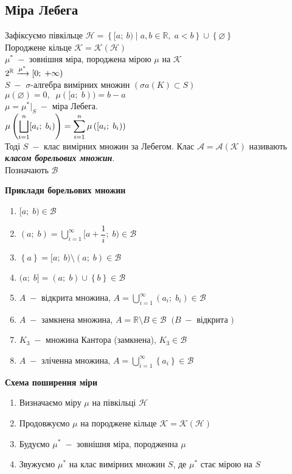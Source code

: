\subsection{\large{Міра Лебега}}
\begin{definition}
Зафіксуємо півкільце $\mathcal{H}=\left\{[a;\:b)\;| \; a,b \in \mathbb{R},\; a<b\right\} \cup \left\{ \varnothing \right\} $ \\
Породжене кільце $\mathcal{K}=\mathcal{K}(\mathcal{H})$\\
$\mu^* \;-$ зовнішня міра, породжена мірою $\mu$ на $\mathcal{K}$\\
$2^{\mathbb{R}} \xrightarrow{\mu^*} [0; \; +\infty)$\\
$S \;-$ $\sigma$-алгебра вимірних множин $(\sigma a(K) \subset S)$\\
$\mu (\varnothing) = 0, \;\; \mu ([a; \;b)) = b-a$\\
$\mu = \mu^*|_S \;-$ міра Лебега.\\
$\mu \left(\displaystyle\bigsqcup\limits_{i = 1}^n [a_i; \; b_i)\right)=\displaystyle\sum\limits_{i=1}^{n}\mu \left([a_i; \; b_i)\right)$\\
Тоді $S\;-$ клас вимірних множин за Лебегом. Клас $\mathcal{A}=\mathcal{A}(\mathcal{K})$ називають  \textcolor{NavyBlue}{\textbf{\textit{класом борельових множин}}}.\\
Позначають $\mathscr{B}$        
\end{definition}
\newpage
\centerline{\textbf{Приклади борельових множин}}
  \begin{enumerate}
        \item $[a; \;b) \in \mathscr{B}$
        \item $(a; \;b) = \displaystyle\bigcup\limits_{i = 1}^{\infty} [a + \dfrac{1}{i}; \; b) \in \mathscr{B}$
        \item $\left\{ a \right\} = [a; \;b) \setminus (a; \; b) \in \mathscr{B}$
        \item $(a; \;b] = (a; \;b) \cup  \left\{ b \right\} \in \mathscr{B}$
        \item  $A\;-$ відкрита множина,  $A = \displaystyle\bigcup\limits_{i = 1}^{\infty} (a_i; \; b_i) \in \mathscr{B}$
        \item  $A\;-$ замкнена множина,  $A = \mathbb{R} \setminus B \in \mathscr{B} \;\; (B\;- $ відкрита $)$
        \item $K_3\;-$ множина Кантора (замкнена), $K_3 \in \mathscr{B}$
        \item $A \; - $ зліченна множина,  $A =\displaystyle\bigcup\limits_{i = 1}^{\infty} \left\{a_i \right\} \in \mathscr{B}$ 
    \end{enumerate}
\centerline{\textbf{Схема поширення міри}} 
\begin{enumerate}
    \item Визначаємо міру $\mu$ на півкільці $\mathcal{H}$
    \item Продовжуємо $\mu$ на породжене кільце
$\mathcal{K}=\mathcal{K}(\mathcal{H})$
\item Будуємо $\mu^*\;-$ зовнішня міра, породженна $\mu$
    \item Звужуємо $\mu^*$ на клас вимірних множин $S$, де $\mu^*$ стає мірою на $S$
\end{enumerate}
    
